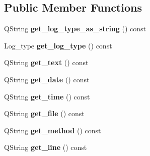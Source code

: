 \subsection*{Public Member Functions}
\begin{DoxyCompactItemize}
\item 
\hypertarget{class_log__viewer_1_1_log__item_ab518dfa8ffa70dcadfc57d65c5f452f2}{Q\-String {\bfseries get\-\_\-log\-\_\-type\-\_\-as\-\_\-string} () const }\label{class_log__viewer_1_1_log__item_ab518dfa8ffa70dcadfc57d65c5f452f2}

\item 
\hypertarget{class_log__viewer_1_1_log__item_ae680189e0ae3c28a5a3d3d5639a2718a}{Log\-\_\-type {\bfseries get\-\_\-log\-\_\-type} () const }\label{class_log__viewer_1_1_log__item_ae680189e0ae3c28a5a3d3d5639a2718a}

\item 
\hypertarget{class_log__viewer_1_1_log__item_a9311ac6bf9998010b63bbcf050895296}{Q\-String {\bfseries get\-\_\-text} () const }\label{class_log__viewer_1_1_log__item_a9311ac6bf9998010b63bbcf050895296}

\item 
\hypertarget{class_log__viewer_1_1_log__item_ad87addf407e7060b161c5e482fb296c8}{Q\-String {\bfseries get\-\_\-date} () const }\label{class_log__viewer_1_1_log__item_ad87addf407e7060b161c5e482fb296c8}

\item 
\hypertarget{class_log__viewer_1_1_log__item_abe7bf92fdc4c5efe0263d9ab6ddc7c3e}{Q\-String {\bfseries get\-\_\-time} () const }\label{class_log__viewer_1_1_log__item_abe7bf92fdc4c5efe0263d9ab6ddc7c3e}

\item 
\hypertarget{class_log__viewer_1_1_log__item_a71f518f482459697abf7f48f1d5611a7}{Q\-String {\bfseries get\-\_\-file} () const }\label{class_log__viewer_1_1_log__item_a71f518f482459697abf7f48f1d5611a7}

\item 
\hypertarget{class_log__viewer_1_1_log__item_ab18ec2426da2f6c15377eff8af273ad0}{Q\-String {\bfseries get\-\_\-method} () const }\label{class_log__viewer_1_1_log__item_ab18ec2426da2f6c15377eff8af273ad0}

\item 
\hypertarget{class_log__viewer_1_1_log__item_aa6d5182cd7135cbc010d5e2ac096b69a}{Q\-String {\bfseries get\-\_\-line} () const }\label{class_log__viewer_1_1_log__item_aa6d5182cd7135cbc010d5e2ac096b69a}


\end{DoxyCompactItemize}
